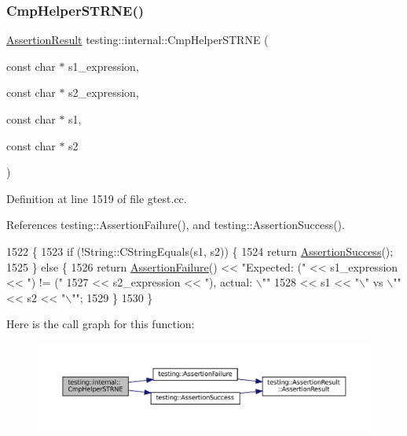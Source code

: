 \subsubsection{\texorpdfstring{Cmp\+Helper\+S\+T\+R\+N\+E()}{CmpHelperSTRNE()}\hspace{0.1cm}{\footnotesize\ttfamily [1/2]}}
{\footnotesize\ttfamily \hyperlink{classtesting_1_1AssertionResult}{Assertion\+Result} testing\+::internal\+::\+Cmp\+Helper\+S\+T\+R\+NE (\begin{DoxyParamCaption}\item[{const char $\ast$}]{s1\+\_\+expression,  }\item[{const char $\ast$}]{s2\+\_\+expression,  }\item[{const char $\ast$}]{s1,  }\item[{const char $\ast$}]{s2 }\end{DoxyParamCaption})}



Definition at line 1519 of file gtest.\+cc.



References testing\+::\+Assertion\+Failure(), and testing\+::\+Assertion\+Success().


\begin{DoxyCode}
1522                                                \{
1523   \textcolor{keywordflow}{if} (!String::CStringEquals(s1, s2)) \{
1524     \textcolor{keywordflow}{return} \hyperlink{namespacetesting_ac1d0baedb17286c5c6c87bd1a45da8ac}{AssertionSuccess}();
1525   \} \textcolor{keywordflow}{else} \{
1526     \textcolor{keywordflow}{return} \hyperlink{namespacetesting_a75cb789614cb1c28c34627a4a3c053df}{AssertionFailure}() << \textcolor{stringliteral}{"Expected: ("} << s1\_expression << \textcolor{stringliteral}{") != ("}
1527                               << s2\_expression << \textcolor{stringliteral}{"), actual: \(\backslash\)""}
1528                               << s1 << \textcolor{stringliteral}{"\(\backslash\)" vs \(\backslash\)""} << s2 << \textcolor{stringliteral}{"\(\backslash\)""};
1529   \}
1530 \}
\end{DoxyCode}
Here is the call graph for this function\+:
\nopagebreak
\begin{figure}[H]
\begin{center}
\leavevmode
\includegraphics[width=350pt]{namespacetesting_1_1internal_af2d31c77ce73e1003a64bd7ca3564bbe_cgraph}
\end{center}
\end{figure}
\mbox{\label{namespacetesting_1_1internal_a415a953647bbc9469f062dc966061efb}} 
